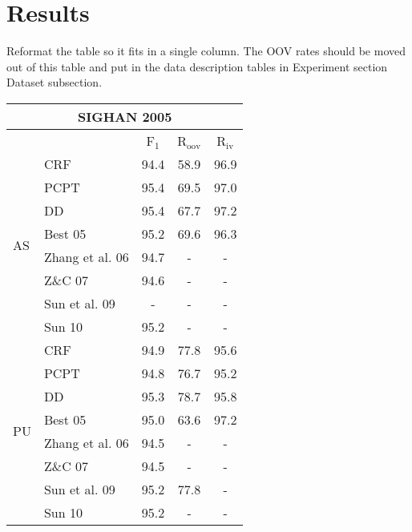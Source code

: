 \section{Results}

Reformat the table so it fits in a single column. 
The OOV rates should be moved out of this table and put in the data description tables in Experiment section Dataset subsection.

\begin{table}
\centering
\begin{small}
\begin{tabular}{ l | l | c | c | c   }
\multicolumn{5}{c}{\large{SIGHAN 2005}} \\
\hline
    \multicolumn{2}{c}{}  & \multicolumn{1}{c}{F$_1$}   &   \multicolumn{1}{c|}{R$_{\mathrm{oov}}$}    &  \multicolumn{1}{c}{R$_{\mathrm{iv}}$}   \\ 
\hline
\multirow{8}{*}{AS} &  CRF       & 94.4  &  58.9 & 96.9 \\
 & PCPT                                       & 95.4  & 69.5 & 97.0 \\ 
& DD                                        & {95.4}  & {67.7} & {97.2} \\
\cline{2-5}
& Best 05      & 95.2 &   69.6 &  96.3 \\
& Zhang et al. 06      & 94.7 &   - & - \\
& Z\&C 07      & 94.6 &   - & - \\
& Sun et al. 09      & -  &  -  & - \\
& Sun 10      & 95.2  &   -  & - \\
\hline


\multirow{8}{*}{PU} &   CRF     & 94.9  &   77.8 &  95.6 \\
& PCPT & 94.8  &  76.7 &  95.2 \\
& DD  & {95.3}  &  {78.7} &95.8 \\
\cline{2-5}
& Best 05     &  95.0   &  63.6 &  {97.2} \\
& Zhang et al. 06      & 94.5 &   - & - \\
& Z\&C 07      & 94.5 &   - & - \\
& Sun et al. 09     & 95.2  &  77.8  & - \\
& Sun 10     & 95.2  &   -  & - \\
\hline


\end{tabular}
\end{small}
\end{table}
